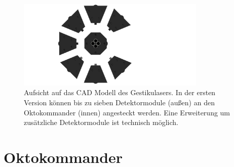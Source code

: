 \begin{figure}[h]
	\centering
	\includegraphics[width=9cm]{../CAD_Bilder/Gestikulaser_raytraced_2.png}
	\caption{Aufsicht auf das CAD Modell des Gestikulasers. In der ersten Version können bis zu sieben Detektormodule (außen) an den Oktokommander (innen) angesteckt werden. Eine Erweiterung um zusätzliche Detektormodule ist technisch möglich.}
	\label{fig:Gestikulaser}
\end{figure}


\section{Oktokommander}
\label{sec:Oktokommander}

